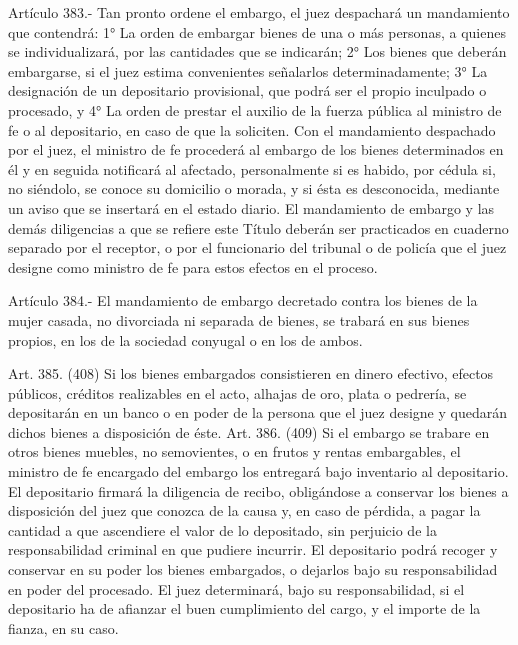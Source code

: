     Artículo 383.-  Tan pronto ordene el embargo, el juez despachará un mandamiento que contendrá:
    1° La orden de embargar bienes de una o más personas, a quienes se individualizará, por las cantidades que se indicarán;
    2° Los bienes que deberán embargarse, si el juez estima convenientes señalarlos determinadamente;
    3° La designación de un depositario provisional, que podrá ser el propio inculpado o procesado, y
    4° La orden de prestar el auxilio de la fuerza pública al ministro de fe o al depositario, en caso de que la soliciten.
    Con el mandamiento despachado por el juez, el ministro de fe procederá al embargo de los bienes determinados en él y en seguida notificará al afectado, personalmente si es habido, por cédula si, no siéndolo, se conoce su domicilio o morada, y si ésta es desconocida, mediante un aviso que se insertará en el estado diario.
    El mandamiento de embargo y las demás diligencias a que se refiere este Título deberán ser practicados en cuaderno separado por el receptor, o por el funcionario del tribunal o de policía que el juez designe como ministro de fe para estos efectos en el proceso.

    Artículo 384.-  El mandamiento de embargo decretado contra los bienes de la mujer casada, no divorciada ni separada de bienes, se trabará en sus bienes propios, en los de la sociedad conyugal o en los de ambos.

    Art. 385. (408) Si los bienes embargados consistieren en dinero efectivo, efectos públicos, créditos realizables en el acto, alhajas de oro, plata o pedrería, se depositarán en un banco o en poder de la persona que el juez designe y quedarán dichos bienes a disposición de éste.
    Art. 386. (409) Si el embargo se trabare en otros bienes muebles, no semovientes, o en frutos y rentas embargables, el ministro de fe encargado del embargo los entregará bajo inventario al depositario.
    El depositario firmará la diligencia de recibo, obligándose a conservar los bienes a disposición del juez que conozca de la causa y, en caso de pérdida, a pagar la cantidad a que ascendiere el valor de lo depositado, sin perjuicio de la responsabilidad criminal en que pudiere incurrir.
    El depositario podrá recoger y conservar en su poder los bienes embargados, o dejarlos bajo su responsabilidad en poder del procesado.
    El juez determinará, bajo su responsabilidad, si el depositario ha de afianzar el buen cumplimiento del cargo, y el importe de la fianza, en su caso.

